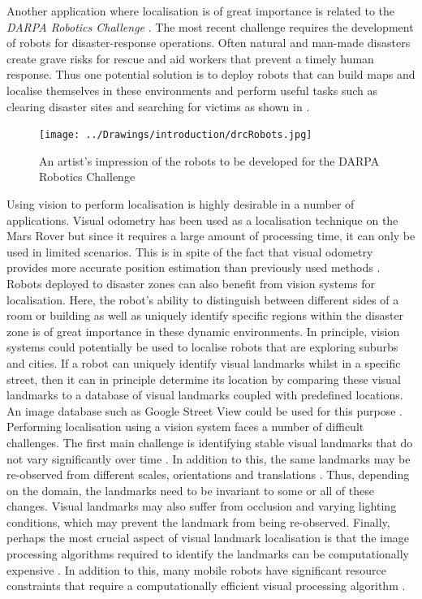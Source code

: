 Another application where localisation is of great importance is related to the \textit{DARPA Robotics Challenge} \citep{darpa2012}. The most recent challenge requires the development of robots for disaster-response operations. Often natural and man-made disasters create grave risks for rescue and aid workers that prevent a timely human response. Thus one potential solution is to deploy robots that can build maps and localise themselves in these environments and perform useful tasks such as clearing disaster sites and searching for victims as shown in .\\   

\begin{figure}[h!] 
  \centering
    \texttt{[image: ../Drawings/introduction/drcRobots.jpg]}
    \caption{An artist's impression of the robots to be developed for the DARPA Robotics Challenge \citep{darpa2012}}
    \label{fig:darpa}
\end{figure}

Using vision to perform localisation is highly desirable in a number of applications. Visual odometry has been used as a localisation technique on the Mars Rover \citep{Di2008} but since it requires a large amount of processing time, it can only be used in limited scenarios. This is in spite of the fact that visual odometry provides more accurate position estimation than previously used methods \citep{Powell2006}. Robots deployed to disaster zones can also benefit from vision systems for localisation. Here, the robot's ability to distinguish between different sides of a room or building as well as uniquely identify specific regions within the disaster zone is of great importance in these dynamic environments. In principle, vision systems could potentially be used to localise robots that are exploring suburbs and cities. If a robot can uniquely identify visual landmarks whilst in a specific street, then it can in principle determine its location by comparing these visual landmarks to a database of visual landmarks coupled with predefined locations. An image database such as Google Street View could be used for this purpose \citep{StreetView}.\\

Performing localisation using a vision system faces a number of difficult challenges. The first main challenge is identifying stable visual landmarks that do not vary significantly over time \citep{Davison2007, Se2002}. In addition to this, the same landmarks may be re-observed from different scales, orientations and translations \citep{Szeliski2010}. Thus, depending on the domain, the landmarks need to be invariant to some or all of these changes. Visual landmarks may also suffer from occlusion and varying lighting conditions, which may prevent the landmark from being re-observed. Finally, perhaps the most crucial aspect of visual landmark localisation is that the image processing algorithms required to identify the landmarks can be computationally expensive \citep{Juan2009}. In addition to this, many mobile robots have significant resource constraints that require a computationally efficient visual processing algorithm \citep{NaoHead}. \\

